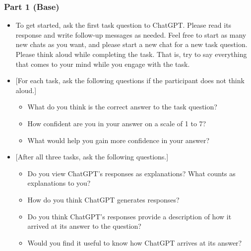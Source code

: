 \subsubsection*{Part 1 (Base)}
\begin{itemize}
    \item To get started, ask the first task question to ChatGPT. Please read its response and write follow-up messages as needed. Feel free to start as many new chats as you want, and please start a new chat for a new task question. Please think aloud while completing the task. That is, try to say everything that comes to your mind while you engage with the task.
    \item {[}For each task, ask the following questions if the participant does not think aloud.{]}
    \begin{itemize}
        \item What do you think is the correct answer to the task question?
        \item How confident are you in your answer on a scale of 1 to 7?
        \item What would help you gain more confidence in your answer?
    \end{itemize}
    \item {[}After all three tasks, ask the following questions.{]}
    \begin{itemize}
        \item Do you view ChatGPT's responses as explanations? What counts as explanations to you? 
        \item How do you think ChatGPT generates responses?
        \item Do you think ChatGPT's responses provide a description of how it arrived at its answer to the question?
        \item Would you find it useful to know how ChatGPT arrives at its answer?
    \end{itemize}
\end{itemize}

